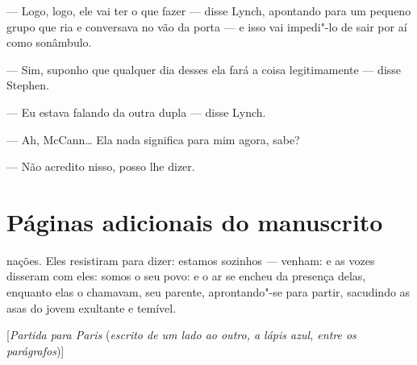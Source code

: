 --- Logo, logo, ele vai ter o que fazer --- disse Lynch, apontando
para um pequeno grupo que ria e conversava no vão da porta --- e isso
vai impedi"-lo de sair por aí como sonâmbulo.


--- Sim, suponho que qualquer dia desses ela fará a coisa
legitimamente --- disse Stephen.

--- Eu estava falando da outra dupla --- disse Lynch.


--- Ah, McCann\ldots{}  Ela nada significa para mim agora, sabe?

--- Não acredito nisso, posso lhe dizer.


\bigskip

{
\par}


\chapter{Páginas adicionais do manuscrito}

{
\par}


\bigskip

\noindent nações.  Eles resistiram para dizer: estamos sozinhos --- venham: e as
vozes disseram com eles: somos o seu povo: e o ar se encheu da presença
delas, enquanto elas o chamavam, seu parente, aprontando"-se para
partir, sacudindo as asas do jovem exultante e temível.


\bigskip

[\textit{Partida para Paris} (\textit{escrito de um lado ao outro, a
lápis azul, entre os parágrafos})]


\bigskip

